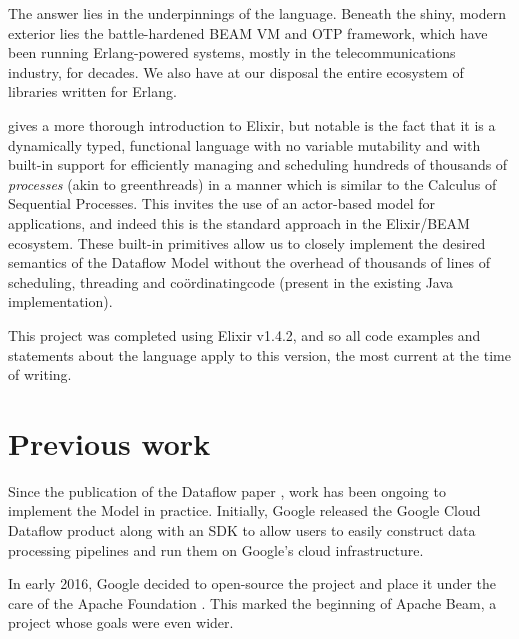 The answer lies in the underpinnings of the language.
Beneath the shiny, modern exterior lies the battle-hardened BEAM VM and OTP framework, which have been running Erlang-powered systems, mostly in the telecommunications industry, for decades.
We also have at our disposal the entire ecosystem of libraries written for Erlang.

 gives a more thorough introduction to Elixir, but notable is the fact that it is a dynamically typed, functional language with no variable mutability and with built-in support for efficiently managing and scheduling hundreds of thousands of \emph{processes} (akin to greenthreads) in a manner which is similar to the Calculus of Sequential Processes.
This invites the use of an actor-based model for applications, and indeed this is the standard approach in the Elixir/BEAM ecosystem.
These built-in primitives allow us to closely implement the desired semantics of the Dataflow Model without the overhead of thousands of lines of scheduling, threading and co\"ordinating\footnotemark[1] code (present in the existing Java implementation).

This project was completed using Elixir v1.4.2, and so all code examples and statements about the language apply to this version, the most current at the time of writing.


\section{Previous work}\label{sec:intro:previous}
Since the publication of the Dataflow paper \cite{Akidau:2015}, work has been ongoing to implement the Model in practice.
Initially, Google released the Google Cloud Dataflow product \cite{CloudDataflow} along with an SDK to allow users to easily construct data processing pipelines and run them on Google's cloud infrastructure.

In early 2016, Google decided to open-source the project and place it under the care of the Apache Foundation \cite{ApacheDataflowPost}.
This marked the beginning of Apache Beam, a project whose goals were even wider.

